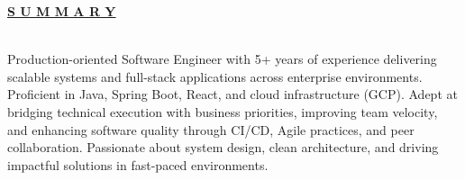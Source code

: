\documentclass[letterpage]{article}
\begin{document}
\textbf{\fontsize{14px}{-1px}\selectfont
  \ul{S U M M A R Y}
}\\
\vspace{7px}\\
\begin{large}Production-oriented Software Engineer with 5+ years of experience delivering scalable systems and full-stack applications across enterprise environments. Proficient in Java, Spring Boot, React, and cloud infrastructure (GCP). Adept at bridging technical execution with business priorities, improving team velocity, and enhancing software quality through CI/CD, Agile practices, and peer collaboration. Passionate about system design, clean architecture, and driving impactful solutions in fast-paced environments. 
\end{large}


\end{document}
